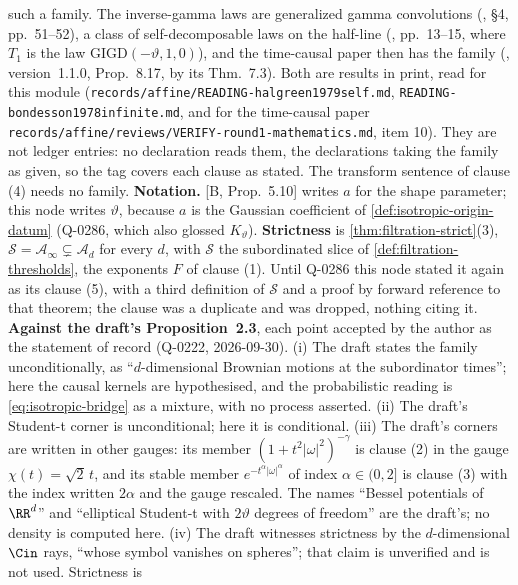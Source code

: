 \begin{proposition}
{such a family. The inverse-gamma laws are generalized gamma convolutions
(, \S4, pp.~51--52), a class of self-decomposable laws on the
half-line (, pp.~13--15, where $T_1$ is the law
$\mathrm{GIGD}(-\vartheta,1,0)$), and the time-causal paper then has the family
(, version~1.1.0, Prop.~8.17, by its Thm.~7.3). Both are results
in print, read for this module (\texttt{records/affine/READING-halgreen1979self.md},
\texttt{READING-bondesson1978infinite.md}, and for the time-causal paper
\texttt{records/affine/reviews/VERIFY-round1-mathematics.md}, item 10). They are not ledger
entries: no declaration reads them, the declarations taking the family as given, so the tag
covers each clause as stated. The transform sentence of clause (4) needs no family.
\textbf{Notation.} [B, Prop.~5.10] writes $a$ for the shape parameter; this node
writes $\vartheta$, because $a$ is the Gaussian coefficient of \ref{def:isotropic-origin-datum}
(Q-0286, which also glossed $K_\vartheta$). \textbf{Strictness} is \ref{thm:filtration-strict}(3),
$\mathcal{S} = \mathcal{A}_\infty \subsetneq \mathcal{A}_d$ for every $d$, with $\mathcal{S}$ the
subordinated slice of \ref{def:filtration-thresholds}, the exponents $F$ of clause (1). Until
Q-0286 this node stated it again as its clause (5), with a third definition of $\mathcal{S}$ and a
proof by forward reference to that theorem; the clause was a duplicate and was dropped, nothing
citing it.
\textbf{Against the draft's Proposition~2.3}, each point accepted by the author as the statement
of record (Q-0222, 2026-09-30). (i) The draft states the family unconditionally, as
``$d$-dimensional Brownian motions at the subordinator times''; here the causal kernels are
hypothesised, and the probabilistic reading is \ref{eq:isotropic-bridge} as a mixture, with no
process asserted. (ii) The draft's Student-t corner is unconditional; here it is conditional.
(iii) The draft's corners are written in other gauges: its \Matern{} member
$(1 + t^2|\omega|^2)^{-\gamma}$ is clause (2) in the gauge $\chi(t) = \sqrt2\,t$, and its stable
member $e^{-t^\alpha|\omega|^\alpha}$ of index $\alpha \in (0,2]$ is clause (3) with the index
written $2\alpha$ and the gauge rescaled. The names ``Bessel potentials of $\RR^d$'' and
``elliptical Student-t with $2\vartheta$ degrees of freedom'' are the draft's; no density is
computed here. (iv) The draft witnesses strictness by the $d$-dimensional $\Cin$ rays, ``whose
symbol vanishes on spheres''; that claim is unverified and is not used. Strictness is
}
\end{proposition}
